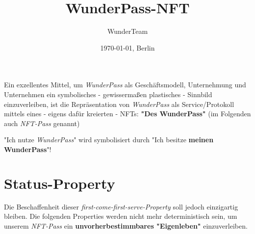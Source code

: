 \documentclass[11pt]{scrartcl}
\title{WunderPass-NFT}
\author{WunderTeam}
\date{\today{}, Berlin}
\begin{document}
\maketitle
\tableofcontents{}




\newpage

Ein exzellentes Mittel, um \textit{WunderPass} als Geschäftsmodell, Unternehmung und Unternehmen ein symbolisches - gewissermaßen plastisches - Sinnbild einzuverleiben, ist die Repräsentation von \textit{WunderPass} als Service/Protokoll mittels eines - eigens dafür kreierten - NFTs: \textbf{"Des WunderPass"} (im Folgenden auch \textit{NFT-Pass} genannt)

\vspace{0.3cm}

\begin{Fazit}

"Ich nutze \textit{WunderPass}" wird symbolisiert durch "Ich besitze \textbf{meinen WunderPass}"!

\end{Fazit}

\vspace{0.3cm}




\section{Status-Property}
\vspace{0.2cm}


Die Beschaffenheit dieser \textit{first-come-first-serve-Property} soll jedoch einzigartig bleiben. Die folgenden Properties werden nicht mehr deterministisch sein, um unserem \textit{NFT-Pass} ein \textbf{unvorherbestimmbares "Eigenleben"} einzuverleiben. 
\end{document}
